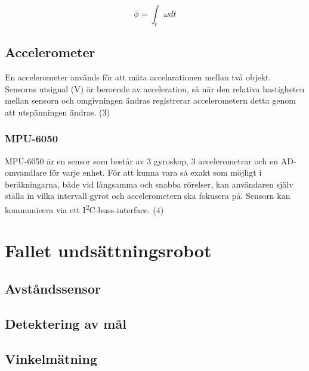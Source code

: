 \documentclass[11pt]{article}
\begin{document}
\begin{flushleft}
  \begin{equation*}
	\phi = \int_{t}^{ }  \omega dt 						
\end{equation*}

\subsection{Accelerometer}
En accelerometer används för att mäta accelarationen mellan två objekt. Sensorns utsignal (V) är beroende av acceleration, så när den relativa hastigheten mellan sensorn och omgivningen ändras registrerar accelerometern detta genom att utspänningen ändras. (3)


\subsubsection{MPU-6050}
MPU-6050 är en sensor som består av 3 gyroskop, 3 accelerometrar och en AD-omvandlare för varje enhet. För att kunna vara så exakt som möjligt i beräkningarna, både vid långsamma och snabba rörelser, kan användaren själv ställa in vilka intervall gyrot och accelerometern ska fokusera på. Sensorn kan kommunicera via ett I\textsuperscript{2}C-buss-interface. (4)



\pagebreak
\section{Fallet undsättningsrobot}

\subsection{Avståndssensor}

\subsection{Detektering av mål}

\subsection{Vinkelmätning}


\end{flushleft}
\end{document}

